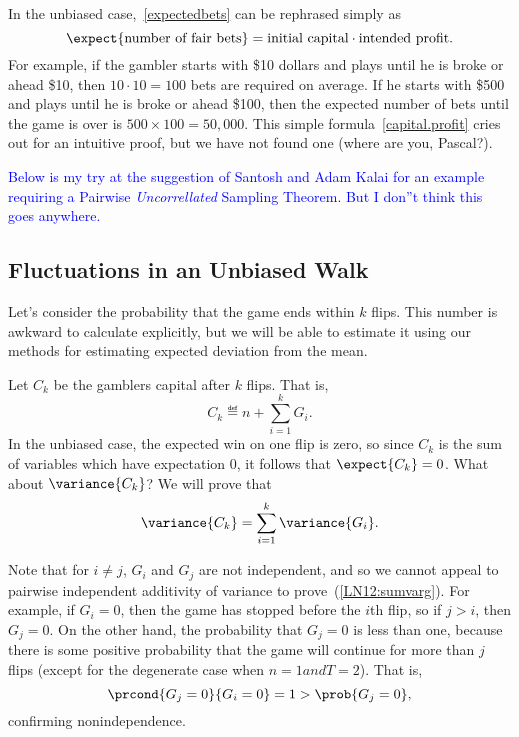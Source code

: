 In the unbiased case,~\eqref{expectedbets} can be rephrased simply as
\begin{equation}\label{capital.profit}
\expect{\text{number of fair bets}} = \text{initial capital}
\cdot \text{intended profit}.
\end{equation}
For example, if the gambler starts with \$10 dollars and plays until
he is broke or ahead \$10, then $10 \cdot 10 = 100$ bets are required
on average.  If he starts with \$500 and plays until he is broke or
ahead \$100, then the expected number of bets until the game is over
is $500 \times 100 = 50,000$.  This simple
formula~\eqref{capital.profit} cries out for an intuitive proof, but
we have not found one (where are you, Pascal?).

\iffalse

\textcolor{blue}{Below is my try at the suggestion of Santosh and Adam
  Kalai for an example requiring a Pairwise \emph{Uncorrellated}
  Sampling Theorem.  But I don''t think this goes anywhere.}

\subsection{Fluctuations in an Unbiased Walk}

Let's consider the probability that the game ends within $k$ flips.  This
number is awkward to calculate explicitly, but we will be able to estimate
it using our methods for estimating expected deviation from the mean.

Let $C_k$ be the gamblers capital after $k$ flips.  That is,
\[
C_k \eqdef n + \sum_{i=1}^k G_i.
\]
In the unbiased case, the expected win on one flip is zero, so since $C_k$
is the sum of variables which have expectation 0, it follows that
$\expect{C_k} = 0$.  What about $\variance{C_k}$?  We will prove that
\begin{equation}\label{LN12:sumvarg}
\variance{C_k} = \sum_{i=1}^k \variance{G_i}.
\end{equation}

Note that for $i \neq j$, $G_i$ and $G_j$ are not independent, and so we
cannot appeal to pairwise independent additivity of variance to
prove~(\ref{LN12:sumvarg}).  For example, if $G_i = 0$, then the game has
stopped before the $i$th flip, so if $j > i$, then $G_j = 0$.  On the
other hand, the probability that $G_j = 0$ is less than one, because there
is some positive probability that the game will continue for more than $j$
flips (except for the degenerate case when $n=1 and T=2$).  That is,
\[
\prcond{G_j = 0}{G_i = 0} = 1 > \prob{G_j = 0},
\]
confirming nonindependence.

